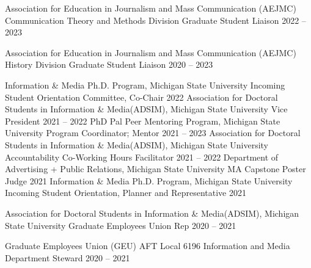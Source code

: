 

\begin{cvhonors}
    \cvhonor
    {Association for Education in Journalism and Mass Communication (AEJMC) Communication Theory and Methods Division} %
    {Graduate Student Liaison } %
    {} %
    {2022 -- 2023} %
    
  \cvhonor
    {Association for Education in Journalism and Mass Communication (AEJMC) History Division} %
    {Graduate Student Liaison } %
    {} %
    {2020 -- 2023} %
 
\end{cvhonors}

\newpage
{}
\begin{cvhonors}
     \cvhonor
    {Information \& Media Ph.D. Program, Michigan State University} %
    {Incoming Student Orientation Committee, Co-Chair} %
    {} %
    {2022} %
     \cvhonor
    {Association for Doctoral Students in Information \& Media(ADSIM), Michigan State University } %
    {Vice President } %
    {} %
    {2021 -- 2022} %
    \cvhonor
    {PhD Pal Peer Mentoring Program, Michigan State University } %
    {Program Coordinator; Mentor} %
    {} %
    {2021 -- 2023} %
    \cvhonor
    {Association for Doctoral Students in Information \& Media(ADSIM), Michigan State University } %
    {Accountability Co-Working Hours Facilitator } %
    {} %
    {2021 -- 2022} %
  \cvhonor
    {Department of Advertising + Public Relations, Michigan State University } %
    {MA Capstone Poster Judge } %
    {} %
    {2021} %
 \cvhonor
    {Information \& Media Ph.D. Program, Michigan State University} %
    {Incoming Student Orientation, Planner and Representative } %
    {} %
    {2021} %
    
  \cvhonor
    {Association for Doctoral Students in Information \& Media(ADSIM), Michigan State University } %
    {Graduate Employees Union Rep } %
    {} %
    {2020 -- 2021} %

  \cvhonor
    {Graduate Employees Union (GEU) AFT Local 6196} %
    {Information and Media Department Steward } %
    {} %
    {2020 -- 2021} %
\end{cvhonors}


